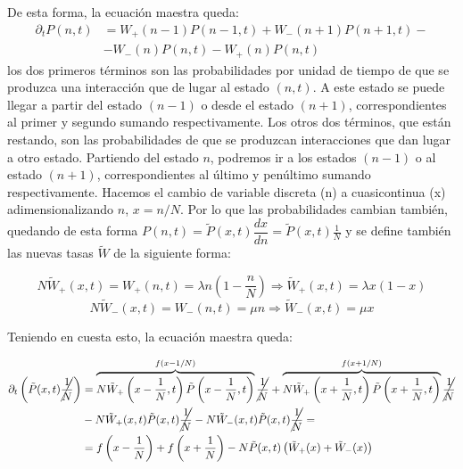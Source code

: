 De esta forma, la ecuación maestra queda:
\begin{equation}
    \begin{split}
        \partial_t P(n,t)&=W_+(n-1)P(n-1,t)+W_-(n+1)P(n+1,t)-\\
        &-W_-(n)P(n,t)-W_+(n)P(n,t)  
    \end{split}
    \label{eq:Ecuación maestra SIS}
\end{equation}
los dos primeros términos son las probabilidades por unidad de tiempo de que se produzca una interacción que de lugar al estado $(n,t)$.
A este estado se puede llegar a partir del estado $(n-1)$ o desde el estado $(n+1)$, correspondientes al primer y segundo sumando respectivamente.
Los otros dos términos, que están restando, son las probabilidades de que se produzcan interacciones que dan lugar a otro estado.
Partiendo del estado $n$, podremos ir a los estados $(n-1)$ o  al estado $(n+1)$, correspondientes al último y penúltimo sumando respectivamente.
Hacemos el cambio de variable discreta (n) a cuasicontinua (x) adimensionalizando $n$, $x=n/N$. Por lo que las probabilidades cambian también, 
quedando de esta forma $P(n,t)=\tilde{P}(x,t)\dfrac{dx}{dn}=\tilde{P}(x,t)\frac{1}{N}$ y se define también las nuevas tasas $\tilde{W}$ de la siguiente forma:

$$N\tilde{W}_{+}(x,t)=W_{+}(n,t)=\lambda n(1- \dfrac{n}{N})\Longrightarrow\tilde{W}_{+}(x,t)=\lambda x(1-x)$$
$$N\tilde{W}_{-}(x,t)=W_{-}(n,t)=\mu n\Longrightarrow\tilde{W}_{-}(x,t)=\mu x$$

Teniendo en cuesta esto, la ecuación maestra queda:

\begin{equation}
    \begin{split}
        \partial_t\left(\tilde{P}(x,t)\cancel{\dfrac{1}{N}}\right)&=\overbrace{N\tilde{W}_{+}\left(x-\frac{1}{N},t\right)\tilde{P}\left(x-\frac{1}{N},t\right)}^{f\left(x-1/N\right)}\cancel{\dfrac{1}{N}}+\overbrace{N\tilde{W}_{+}\left(x+\frac{1}{N},t\right)\tilde{P}\left(x+\frac{1}{N},t\right)}^{f\left(x+1/N\right)}\cancel{\dfrac{1}{N}}\\
        &-N\tilde{W}_{+}(x,t)\tilde{P}(x,t)\cancel{\dfrac{1}{N}} -N\tilde{W}_{-}(x,t)\tilde{P}(x,t)\cancel{\dfrac{1}{N}}=\\
        &= f\left( x-\frac{1}{N} \right)+f\left( x+\frac{1}{N} \right)-N\tilde{P}(x,t)\left( \tilde{W}_{+}(x)+\tilde{W}_{-}(x) \right)
    \end{split}
    \label{eq:ec fokker}
\end{equation}

